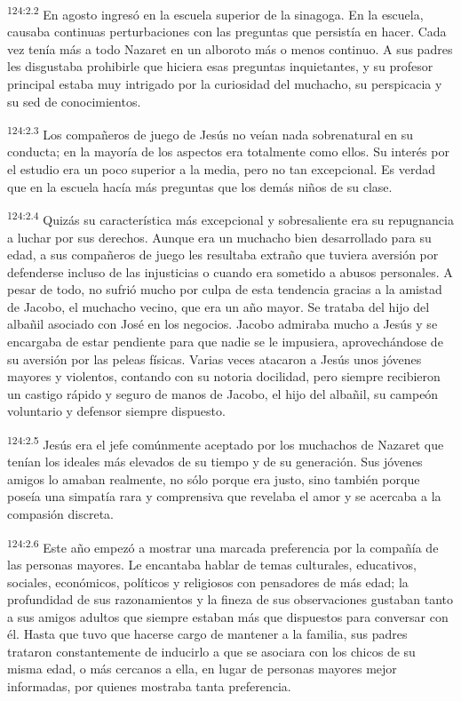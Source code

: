 \par 
\textsuperscript{124:2.2} En agosto ingresó en la escuela superior de la sinagoga. En la escuela, causaba continuas perturbaciones con las preguntas que persistía en hacer. Cada vez tenía más a todo Nazaret en un alboroto más o menos continuo. A sus padres les disgustaba prohibirle que hiciera esas preguntas inquietantes, y su profesor principal estaba muy intrigado por la curiosidad del muchacho, su perspicacia y su sed de conocimientos.

\par 
\textsuperscript{124:2.3} Los compañeros de juego de Jesús no veían nada sobrenatural en su conducta; en la mayoría de los aspectos era totalmente como ellos. Su interés por el estudio era un poco superior a la media, pero no tan excepcional. Es verdad que en la escuela hacía más preguntas que los demás niños de su clase.

\par 
\textsuperscript{124:2.4} Quizás su característica más excepcional y sobresaliente era su repugnancia a luchar por sus derechos. Aunque era un muchacho bien desarrollado para su edad, a sus compañeros de juego les resultaba extraño que tuviera aversión por defenderse incluso de las injusticias o cuando era sometido a abusos personales. A pesar de todo, no sufrió mucho por culpa de esta tendencia gracias a la amistad de Jacobo, el muchacho vecino, que era un año mayor. Se trataba del hijo del albañil asociado con José en los negocios. Jacobo admiraba mucho a Jesús y se encargaba de estar pendiente para que nadie se le impusiera, aprovechándose de su aversión por las peleas físicas. Varias veces atacaron a Jesús unos jóvenes mayores y violentos, contando con su notoria docilidad, pero siempre recibieron un castigo rápido y seguro de manos de Jacobo, el hijo del albañil, su campeón voluntario y defensor siempre dispuesto.

\par 
\textsuperscript{124:2.5} Jesús era el jefe comúnmente aceptado por los muchachos de Nazaret que tenían los ideales más elevados de su tiempo y de su generación. Sus jóvenes amigos lo amaban realmente, no sólo porque era justo, sino también porque poseía una simpatía rara y comprensiva que revelaba el amor y se acercaba a la compasión discreta.

\par 
\textsuperscript{124:2.6} Este año empezó a mostrar una marcada preferencia por la compañía de las personas mayores. Le encantaba hablar de temas culturales, educativos, sociales, económicos, políticos y religiosos con pensadores de más edad; la profundidad de sus razonamientos y la fineza de sus observaciones gustaban tanto a sus amigos adultos que siempre estaban más que dispuestos para conversar con él. Hasta que tuvo que hacerse cargo de mantener a la familia, sus padres trataron constantemente de inducirlo a que se asociara con los chicos de su misma edad, o más cercanos a ella, en lugar de personas mayores mejor informadas, por quienes mostraba tanta preferencia.

